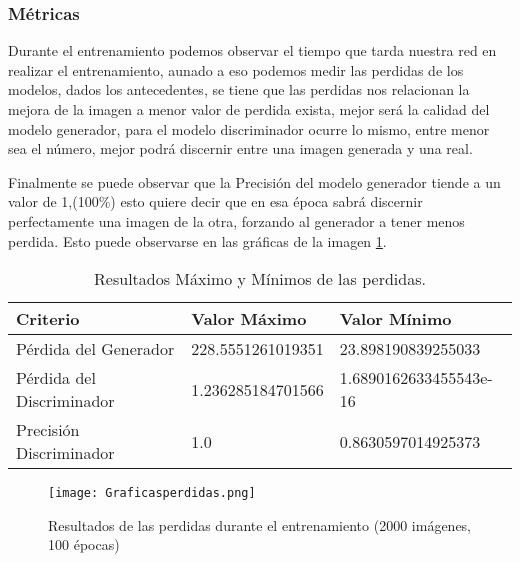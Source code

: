 \subsubsection{Métricas}

 Durante el entrenamiento podemos observar el tiempo que tarda nuestra red en realizar el entrenamiento, aunado a eso 
 podemos medir las perdidas de los modelos, dados los antecedentes, se tiene que las perdidas nos relacionan la mejora de la imagen
 a menor valor de perdida exista, mejor será la calidad del modelo generador, para el modelo discriminador ocurre lo mismo,
 entre menor sea el número, mejor podrá discernir entre una imagen generada y una real.

 Finalmente se puede observar que la Precisión del modelo generador tiende a un valor de 1,(100\%) esto quiere decir que
 en esa época sabrá discernir perfectamente una imagen de la otra, forzando al generador a tener menos perdida. Esto puede observarse en las
 gráficas de la imagen \ref{Alexis10}.

 \begin{table}[H]
  \centering
  \caption{Resultados Máximo y Mínimos de las perdidas.}
  \begin{tabular}{|l|l|l|}
  \hline
  \textbf{Criterio} & \textbf{Valor Máximo} & \textbf{Valor Mínimo}  \\ \hline
  Pérdida del Generador           & 228.5551261019351              & 23.898190839255033     \\
  Pérdida del Discriminador       & 1.236285184701566              & 1.6890162633455543e-16  \\
  Precisión Discriminador         & 1.0                            & 0.8630597014925373       \\ \hline
  \end{tabular}
\end{table}



\begin{figure}[H]
  \begin{center}
    \texttt{[image: Graficasperdidas.png]}
    \caption{Resultados de las perdidas durante el entrenamiento (2000 imágenes, 100 épocas)}
    \label{Alexis10}
  \end{center}
\end{figure}